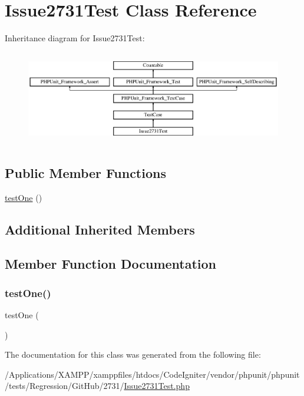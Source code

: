 \hypertarget{class_issue2731_test}{}\section{Issue2731\+Test Class Reference}
\label{class_issue2731_test}
Inheritance diagram for Issue2731\+Test\+:\begin{figure}[H]
\begin{center}
\leavevmode
\includegraphics[height=4.129793cm]{class_issue2731_test}
\end{center}
\end{figure}
\subsection*{Public Member Functions}
\begin{DoxyCompactItemize}
\item 
\mbox{\hyperlink{class_issue2731_test_afbf3ff88b322c6a7197ce02297cd23a0}{test\+One}} ()
\end{DoxyCompactItemize}
\subsection*{Additional Inherited Members}


\subsection{Member Function Documentation}
\mbox{\label{class_issue2731_test_afbf3ff88b322c6a7197ce02297cd23a0}} 
\subsubsection{\texorpdfstring{test\+One()}{testOne()}}
{\footnotesize\ttfamily test\+One (\begin{DoxyParamCaption}{ }\end{DoxyParamCaption})}



The documentation for this class was generated from the following file\+:\begin{DoxyCompactItemize}
\item 
/\+Applications/\+X\+A\+M\+P\+P/xamppfiles/htdocs/\+Code\+Igniter/vendor/phpunit/phpunit/tests/\+Regression/\+Git\+Hub/2731/\mbox{\hyperlink{_issue2731_test_8php}{Issue2731\+Test.\+php}}\end{DoxyCompactItemize}
